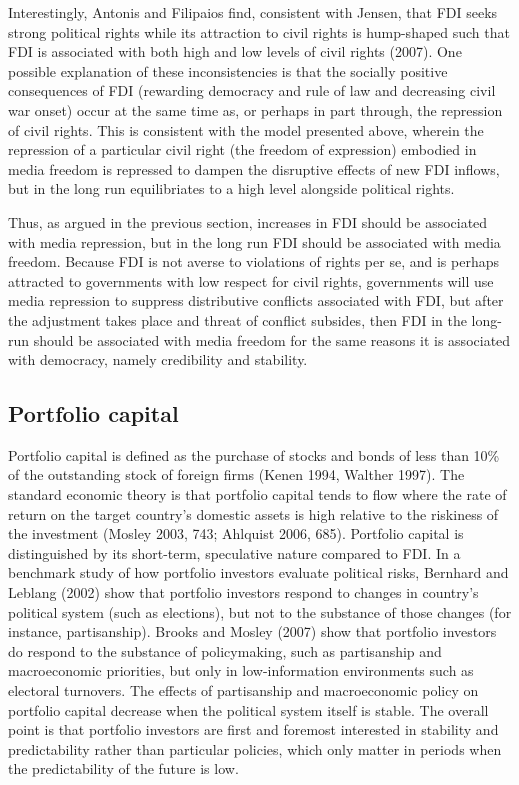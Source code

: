 \documentclass[a4paper]{article}\usepackage[]{graphicx}\usepackage[]{color}
\begin{document}
Interestingly, Antonis and Filipaios find, consistent with Jensen, that FDI seeks strong political rights while its attraction to civil rights is hump-shaped such that FDI is associated with both high and low levels of civil rights (2007). One possible explanation of these inconsistencies is that the socially positive consequences of FDI (rewarding democracy and rule of law and decreasing civil war onset) occur at the same time as, or perhaps in part through, the repression of civil rights. This is consistent with the model presented above, wherein the repression of a particular civil right (the freedom of expression) embodied in media freedom is repressed to dampen the disruptive effects of new FDI inflows, but in the long run equilibriates to a high level alongside political rights.

Thus, as argued in the previous section, increases in FDI should be associated with media repression, but in the long run FDI should be associated with media freedom. Because FDI is not averse to violations of rights per se, and is perhaps attracted to governments with low respect for civil rights, governments will use media repression to suppress distributive conflicts associated with FDI, but after the adjustment takes place and threat of conflict subsides, then FDI in the long-run should be associated with media freedom for the same reasons it is associated with democracy, namely credibility and stability.

\subsection{Portfolio capital}

Portfolio capital is defined as the purchase of stocks and bonds of less than 10\% of the outstanding stock of foreign firms (Kenen 1994, Walther 1997). The standard economic theory is that portfolio capital tends to flow where the rate of return on the target country's domestic assets is high relative to the riskiness of the investment (Mosley 2003, 743; Ahlquist 2006, 685). Portfolio capital is distinguished by its short-term, speculative nature compared to FDI. In a benchmark study of how portfolio investors evaluate political risks, Bernhard and Leblang (2002) show that portfolio investors respond to changes in country's political system (such as elections), but not to the substance of those changes (for instance, partisanship). Brooks and Mosley (2007) show that portfolio investors do respond to the substance of policymaking, such as partisanship and macroeconomic priorities, but only in low-information environments such as electoral turnovers. The effects of partisanship and macroeconomic policy on portfolio capital decrease when the political system itself is stable. The overall point is that portfolio investors are first and foremost interested in stability and predictability rather than particular policies, which only matter in periods when the predictability of the future is low.
\end{document}
